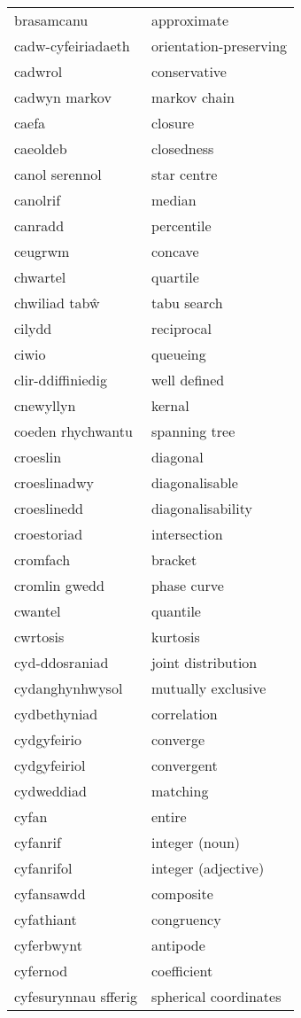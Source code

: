 \begin{supertabular}{p{0.22\textwidth}p{0.22\textwidth}}
brasamcanu & approximate \\
cadw-cyfeiriadaeth & orientation-preserving \\
cadwrol & conservative \\
cadwyn markov & markov chain \\
caefa & closure \\
caeoldeb & closedness \\
canol serennol & star centre \\
canolrif & median \\
canradd & percentile \\
ceugrwm & concave \\
chwartel & quartile \\
chwiliad tabŵ & tabu search \\
cilydd & reciprocal \\
ciwio & queueing \\
clir-ddiffiniedig & well defined \\
cnewyllyn & kernal \\
coeden rhychwantu & spanning tree \\
croeslin & diagonal \\
croeslinadwy & diagonalisable \\
croeslinedd & diagonalisability \\
croestoriad & intersection \\
cromfach & bracket \\
cromlin gwedd & phase curve \\
cwantel & quantile \\
cwrtosis & kurtosis \\
cyd-ddosraniad & joint distribution \\
cydanghynhwysol & mutually exclusive \\
cydbethyniad & correlation \\
cydgyfeirio & converge \\
cydgyfeiriol & convergent \\
cydweddiad & matching \\
cyfan & entire \\
cyfanrif & integer (noun) \\
cyfanrifol & integer (adjective) \\
cyfansawdd & composite \\
cyfathiant & congruency \\
cyferbwynt & antipode \\
cyfernod & coefficient \\
cyfesurynnau sfferig & spherical coordinates \\

\end{supertabular}
